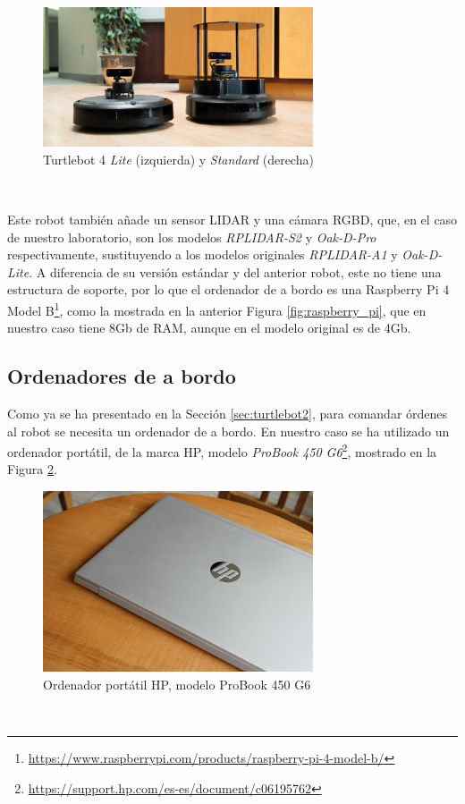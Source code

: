 \begin{figure} [h!]
  \begin{center}
    \includegraphics[width=8cm]{figs/turtlebot4}
  \end{center}
  \caption{Turtlebot 4 \textit{Lite} (izquierda) y \textit{Standard} (derecha) \cite{turtlebot4}}
  \label{fig:turtlebot4}
\end{figure}\

Este robot también añade un sensor LIDAR y una cámara RGBD, que, en el caso de
nuestro laboratorio, son los modelos \textit{RPLIDAR-S2} y \textit{Oak-D-Pro}
respectivamente, sustituyendo a los modelos originales \textit{RPLIDAR-A1} y
\textit{Oak-D-Lite}.
A diferencia de su versión estándar y del anterior robot, este no tiene una
estructura de soporte, por lo que el ordenador de a bordo es una Raspberry
Pi 4 Model B\footnote{
\href{https://www.raspberrypi.com/products/raspberry-pi-4-model-b/}{https://www.raspberrypi.com/products/raspberry-pi-4-model-b/}},
como la mostrada en la anterior Figura \ref{fig:raspberry_pi}, que en nuestro
caso tiene 8Gb de RAM, aunque en el modelo original es de 4Gb.
\\


\subsection{Ordenadores de a bordo}
\label{sec:a_bordo}

Como ya se ha presentado en la Sección \ref{sec:turtlebot2}, para comandar
órdenes al robot se necesita un ordenador de a bordo.
En nuestro caso se ha utilizado un ordenador portátil, de la marca HP, modelo
\textit{ProBook 450 G6}\footnote{
\href{https://support.hp.com/es-es/document/c06195762}{https://support.hp.com/es-es/document/c06195762}},
mostrado en la Figura \ref{fig:hp_probook}.
\\

\begin{figure} [h!]
  \begin{center}
    \includegraphics[width=8cm]{figs/hp_probook}
  \end{center}
  \caption{Ordenador portátil HP, modelo ProBook 450 G6 \cite{hp_probook}}
  \label{fig:hp_probook}
\end{figure}\


